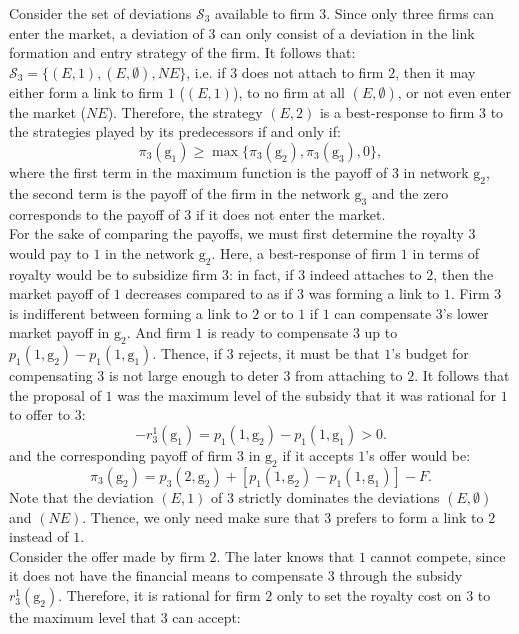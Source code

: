\documentclass{article}
\begin{document}
Consider the set of deviations $\mathcal{S}_3$ available to firm $3$. Since only three firms can enter the market, a deviation of $3$ can only consist of a deviation in the link formation and entry strategy of the firm. It follows that: $\mathcal{S}_3=\{(E,1),(E,\emptyset), NE\}$, i.e. if $3$ does not attach to firm $2$, then it may either form a link to firm $1$ ($(E,1)$), to no firm at all $(E,\emptyset)$, or not even enter the market ($NE$). Therefore, the strategy $(E,2)$ is a best-response to firm $3$ to the strategies played by its predecessors if and only if: 
\begin{equation*}
    \pi_3(\text{g}_1)\geq \max\{\pi_3(\text{g}_2), \pi_3(\text{g}_3), 0\},
\end{equation*}
where the first term in the maximum function is the payoff of $3$ in network $\text{g}_2$, the second term is the payoff of the firm in the network $\text{g}_3$ and the zero corresponds to the payoff of $3$ if it does not enter the market. \\
\indent For the sake of comparing the payoffs, we must first determine the royalty $3$ would pay to $1$ in the network $\text{g}_2$. Here, a best-response of firm $1$ in terms of royalty would be to subsidize firm $3$: in fact, if $3$ indeed attaches to $2$, then the market payoff of $1$ decreases compared to as if $3$ was forming a link to $1$. Firm $3$ is indifferent between forming a link to $2$ or to $1$ if $1$ can compensate $3$'s lower market payoff in $\text{g}_2$. And firm $1$ is ready to compensate $3$ up to $p_1(1,\text{g}_2)-p_1(1,\text{g}_1)$. Thence, if $3$ rejects, it must be that $1$'s budget for compensating $3$ is not large enough to deter $3$ from attaching to $2$. It follows that the proposal of $1$ was the maximum level of the subsidy that it was rational for $1$ to offer to $3$:  
\begin{equation*}
   - r^1_3(\text{g}_1)= p_1(1,\text{g}_2)-p_1(1,\text{g}_1)>0. 
\end{equation*}
and the corresponding payoff of firm $3$ in $\text{g}_2$ if it accepts $1$'s offer would  be: 
\begin{equation}
    \pi_3(\text{g}_2)= p_3(2,\text{g}_2) + [p_1(1,\text{g}_2)-p_1(1,\text{g}_1)] -F. 
\end{equation}
Note that the deviation $(E,1)$ of $3$ strictly dominates the deviations $(E,\emptyset)$ and $(NE)$. Thence, we only need make sure that $3$ prefers to form a link to $2$ instead of $1$. \\
\indent Consider the offer made by firm $2$. The later knows that $1$ cannot compete, since it does not have the financial means to compensate $3$ through the subsidy $r^1_3(\text{g}_2)$. Therefore, it is rational for firm $2$ only to set the royalty cost on $3$ to the maximum level that $3$ can accept: 
\end{document}
